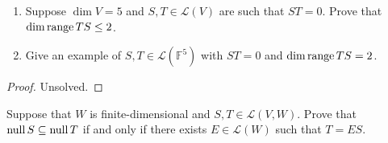 \begin{exercise}
    \begin{enumerate}[label={(\alph*)}]
        \item Suppose $\dim V = 5$ and $S, T \in \mathcal{L}(V)$ are such that $ST = 0$. Prove that $\dim \text{range}\,{TS} \leq 2$.
        \item Give an example of $S, T \in \mathcal{L}(\mathbb{F}^{5})$ with $ST = 0$ and $\dim\text{range}\,{TS} = 2$.
    \end{enumerate}
\end{exercise}

\begin{proof}
    Unsolved.
\end{proof}
\newpage

\begin{exercise}
    Suppose that $W$ is finite-dimensional and $S, T \in \mathcal{L}(V, W)$. Prove that $\text{null}\,{S} \subseteq \text{null}\,{T}$ if and only if there exists $E \in \mathcal{L}(W)$ such that $T = ES$.
\end{exercise}


